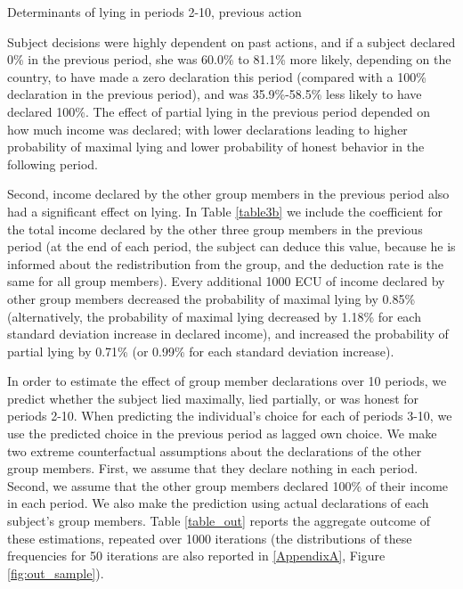 \documentclass[12pt]{article}
\begin{document}
\begin{table}[ht]
\begin{center}
\tiny

\end{center}
\caption{Determinants of lying in periods 2-10, previous action}
\label{table3b}
\end{table}

\par Subject decisions were highly dependent on past actions, and if a subject declared 0\% in the previous period, she was 60.0\% to 81.1\% more likely, depending on the country, to have made a zero declaration this period (compared with a 100\% declaration in the previous period), and was 35.9\%-58.5\% less likely to have declared 100\%. The effect of partial lying in the previous period depended on how much income was declared; with lower declarations leading to higher probability of maximal lying and lower probability of honest behavior in the following period. 

\par Second, income declared by the other group members in the previous period also had a significant effect on lying. In Table \ref{table3b} we include the coefficient for the total income declared by the other three group members in the previous period (at the end of each period, the subject can deduce this value, because he is informed about the redistribution from the group, and the deduction rate is the same for all group members). Every additional 1000 ECU of income declared by other group members decreased the probability of maximal lying by 0.85\% (alternatively, the probability of maximal lying decreased by 1.18\% for each standard deviation increase in declared income), and increased the probability of partial lying by 0.71\% (or 0.99\% for each standard deviation increase). 

\par In order to estimate the effect of group member declarations over 10 periods, we predict whether the subject lied maximally, lied partially, or was honest for periods 2-10.\footnotemark{}
When predicting the individual's choice for each of periods 3-10, we use the predicted choice in the previous period as lagged own choice. We make two extreme counterfactual assumptions about the declarations of the other group members. First, we assume that they declare nothing in each period. Second, we assume that the other group members declared 100\% of their income in each period. We also make the prediction using actual declarations of each subject's group members. 
Table \ref{table_out} reports the aggregate outcome of these estimations, repeated over 1000 iterations (the distributions of these frequencies for 50 iterations are also reported in \ref{AppendixA}, Figure \ref{fig:out_sample}).
\end{document}
